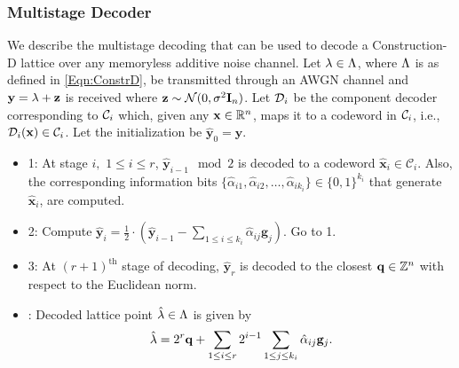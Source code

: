 \subsubsection*{Multistage Decoder}
We describe the multistage decoding that can be used to decode a Construction-D lattice over any memoryless additive noise channel. Let $\lambda\in\Lambda$, where $\Lambda$ is as defined in \eqref{Eqn:ConstrD}, be transmitted through an AWGN channel and $\mathbf{y}=\lambda+\mathbf{z}$ is received where $\mathbf{z}\sim\mathcal{N}(0,\sigma^{2} \mathbf{I}_{n})$. Let $\mathcal{D}_{i}$ be the component decoder corresponding to $\mathcal{C}_{i}$ which, given any $\mathbf{x}\in\mathbb{R}^{n}$, maps it to a codeword in $\mathcal{C}_{i}$, i.e., $\mathcal{D}_{i}(\mathbf{x})\in\mathcal{C}_{i}$. Let the initialization be $\hat{\mathbf{y}}_{0}=\mathbf{y}$.
\begin{itemize}
\item {} 1: At stage $i, $ $1\leq i\leq r$, $\hat{\mathbf{y}}_{i-1}\mod 2$ is decoded to a codeword  $\hat{\mathbf{x}}_{i}\in \mathcal{C}_{i}$. Also, the corresponding information bits  $\{\hat{\alpha}_{i1},\hat{\alpha}_{i2},\ldots, \hat{\alpha}_{ik_{i}}\}\in \{0,1\}^{k_{i}}$ that generate $\hat{\mathbf{x}}_{i}$, are computed.
\item {} 2: Compute $\hat{\mathbf{y}}_{i}= \frac{1}{2} \cdot(\hat{\mathbf{y}}_{i-1}-\sum_{1\leq i\leq k_{i}}\hat{\alpha}_{ij}\mathbf{g}_j)$. Go to  1.
\item {} 3: At $(r+1)^{\text{th}}$ stage of decoding, $\hat{\mathbf{y}}_{r}$ is decoded to the closest $\mathbf{q}\in\mathbb{Z}^{n}$ with respect to the Euclidean norm.
\item {}: Decoded lattice point $\hat{\mathbf{\lambda}}\in\Lambda$ is given by
\begin{align}
    \hat{\mathbf{\lambda}}=2^{r}\mathbf{q}+\sum_{1\leq i\leq r}2^{i-1}\sum_{1\leq j\leq k_{i}}\hat{\alpha}_{ij}\mathbf{g}_{j}.
\end{align}

\end{itemize}

